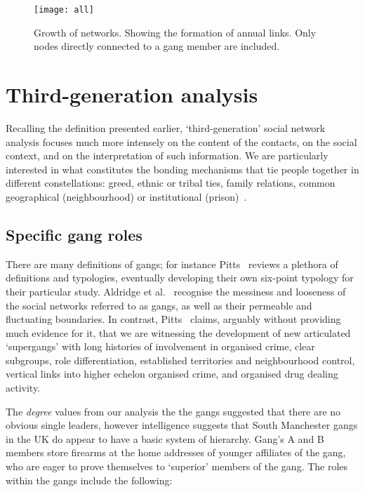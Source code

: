 \documentclass[conference]{IEEEtran}
\theoremstyle{definition}
\begin{document}
\begin{figure}[!ht] 
\centering
\texttt{[image: all]}
\caption{Growth of networks. Showing the formation of annual links. Only nodes directly connected to a gang member are included.}
\label{fig:all}
\end{figure}


\section{Third-generation analysis}\label{sec:thirdanalysis}
Recalling the definition presented earlier, `third-generation' social
network analysis focuses much more intensely on the content of the
contacts, on the social context, and on the interpretation of such
information. We are particularly interested in what constitutes the
bonding mechanisms that tie people together in different
constellations: greed, ethnic or tribal ties, family relations, common
geographical (neighbourhood) or institutional
(prison)~\cite{Klerks2001}.


\subsection{Specific gang roles}\label{sec:shortestpaths}
There are many definitions of gangs; for instance
Pitts~\cite{pitts:2007} reviews a plethora of definitions and
typologies, eventually developing their own six-point typology for
their particular study.  Aldridge et al.~\cite{aldridge-et-al:2008}
recognise the messiness and looseness of the social networks referred
to as gangs, as well as their permeable and fluctuating boundaries.
In contrast, Pitts~\cite{pitts:2008} claims, arguably without
providing much evidence for it, that we are witnessing the development
of new articulated `supergangs' with long histories of involvement in
organised crime, clear subgroups, role differentiation, established
territories and neighbourhood control, vertical links into higher
echelon organised crime, and organised drug dealing activity.

The \emph{degree} values from our analysis the the gangs suggested
that there are no obvious single leaders, however intelligence
suggests that South Manchester gangs in the UK do appear to have a
basic system of hierarchy. Gang's A and B members store firearms at
the home addresses of younger affiliates of the gang, who are eager to
prove themselves to `superior' members of the gang. The roles within
the gangs include the following:
\end{document}
